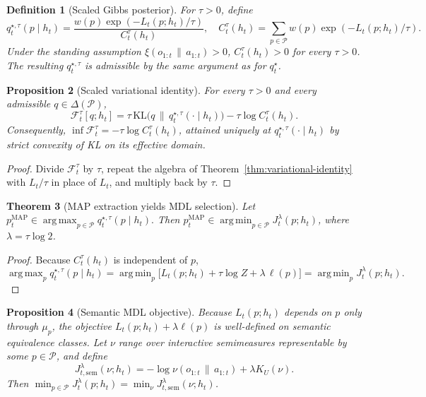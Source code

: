 \documentclass[11pt]{article}
\newtheorem{definition}{Definition}[section]
\newtheorem{proposition}[definition]{Proposition}
\newtheorem{theorem}[definition]{Theorem}
\theoremstyle{remark}
\newcommand{\Pcal}{\mathcal{P}}
\newcommand{\Fcal}{\mathcal{F}}
\newcommand{\KL}{\mathrm{KL}}
\newcommand{\argmin}{\mathop{\mathrm{arg\,min}}}
\newcommand{\argmax}{\mathop{\mathrm{arg\,max}}}
\newcommand{\givena}{\,\|\,}
\newcommand{\ellp}{\ell}
\begin{document}
\begin{definition}[Scaled Gibbs posterior]
For \(\tau>0\), define
\[
q_t^{\star,\tau}(p \mid h_t)
= \frac{w(p)\exp(-L_t(p;h_t)/\tau)}
{C_t^\tau(h_t)},
\quad
C_t^\tau(h_t)
= \sum_{p \in \Pcal} w(p)\exp(-L_t(p;h_t)/\tau).
\]
Under the standing assumption \(\xi(o_{1:t}\givena a_{1:t})>0\), \(C_t^\tau(h_t)>0\) for every \(\tau>0\). The resulting \(q_t^{\star,\tau}\) is admissible by the same argument as for \(q_t^\star\).
\end{definition}

\begin{proposition}[Scaled variational identity]
For every \(\tau>0\) and every admissible \(q \in \Delta(\Pcal)\),
\[
\Fcal_t^\tau[q;h_t]
= \tau\,\KL\!\bigl(q \,\|\, q_t^{\star,\tau}(\cdot \mid h_t)\bigr)
- \tau \log C_t^\tau(h_t).
\]
Consequently, \(\inf \Fcal_t^\tau = - \tau \log C_t^\tau(h_t)\), attained uniquely at \(q_t^{\star,\tau}(\cdot\mid h_t)\) by strict convexity of KL on its effective domain.
\end{proposition}

\begin{proof}
Divide \(\Fcal_t^\tau\) by \(\tau\), repeat the algebra of Theorem~\ref{thm:variational-identity} with \(L_t/\tau\) in place of \(L_t\), and multiply back by \(\tau\).
\end{proof}

\begin{theorem}[MAP extraction yields MDL selection]
Let
\(
p_t^{\mathrm{MAP}} \in \argmax_{p \in \Pcal} q_t^{\star,\tau}(p \mid h_t).
\)
Then \(p_t^{\mathrm{MAP}} \in \argmin_{p \in \Pcal} J_t^\lambda(p;h_t)\), where \(\lambda=\tau\log 2\).
\end{theorem}

\begin{proof}
Because \(C_t^\tau(h_t)\) is independent of \(p\),
\[
\argmax_p q_t^{\star,\tau}(p\mid h_t)
= \argmin_p \bigl[L_t(p;h_t) + \tau\log Z + \lambda\,\ellp(p)\bigr]
= \argmin_p J_t^\lambda(p;h_t).
\]
\end{proof}

\begin{proposition}[Semantic MDL objective]
Because \(L_t(p;h_t)\) depends on \(p\) only through \(\mu_p\), the objective \(L_t(p;h_t) + \lambda \ell(p)\) is well-defined on semantic equivalence classes. Let \(\nu\) range over interactive semimeasures representable by some \(p\in\Pcal\), and define
\[
J_{t,\mathrm{sem}}^\lambda(\nu;h_t)
= -\log \nu(o_{1:t}\givena a_{1:t}) + \lambda K_U(\nu).
\]
Then \(\min_{p \in \Pcal} J_t^\lambda(p;h_t) = \min_{\nu} J_{t,\mathrm{sem}}^\lambda(\nu;h_t)\).
\end{proposition}
\end{document}
